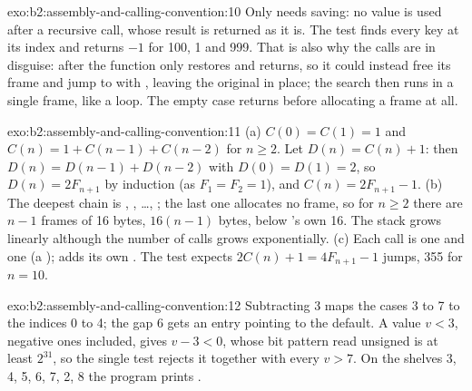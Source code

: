\begin{solution}{exo:b2:assembly-and-calling-convention:10}
Only  needs saving: no value is used after a recursive call, whose result is returned as it is. The test
finds every key at its index and returns $-1$ for 100, 1 and 999. That is also why the calls are  in
disguise: after  the function only restores  and returns, so it could instead free its
frame and jump to  with , leaving the original  in place; the search then runs in a
single frame, like a loop. The empty case returns before allocating a frame at all.
\end{solution}

\begin{solution}{exo:b2:assembly-and-calling-convention:11}
(a) $C(0) = C(1) = 1$ and $C(n) = 1 + C(n-1) + C(n-2)$ for $n \ge 2$. Let $D(n) = C(n) + 1$: then $D(n) = D(n-1) +
D(n-2)$ with $D(0) = D(1) = 2$, so $D(n) = 2F_{n+1}$ by induction (as $F_1 = F_2 = 1$), and $C(n) = 2F_{n+1} - 1$.
(b) The deepest chain is , , \ldots, ; the last one allocates no frame, so
for $n \ge 2$ there are $n - 1$ frames of 16 bytes, $16(n-1)$ bytes, below 's own 16. The stack grows
linearly although the number of calls grows exponentially.
(c) Each call is one  and one  (a );  adds its own . The test
expects $2C(n) + 1 = 4F_{n+1} - 1$ jumps, 355 for $n = 10$.
\end{solution}

\begin{solution}{exo:b2:assembly-and-calling-convention:12}
Subtracting 3 maps the cases 3 to 7 to the indices 0 to 4; the gap 6 gets an entry pointing to the default. A value
$v < 3$, negative ones included, gives $v - 3 < 0$, whose bit pattern read unsigned is at least $2^{31}$, so the
single test  rejects it together with every $v > 7$. On the shelves 3, 4, 5, 6, 7, 2, 8 the
program prints .
\end{solution}

